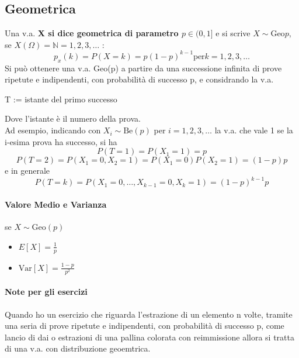 \documentclass[12pt, a4paper, openany]{book}
\begin{document}
\subsection*{Geometrica}
Una v.a. \textbf{X si dice geometrica di parametro $p \in (0,1]$} e si scrive 
\textbf{$X \sim \text{Geo}p$}, se \textbf{$X(\Omega)=\mathbb{N} = {1,2,3,\dots}$} :
\begin{equation*}
    p_x (k) = P(X = k) = p(1-p)^{k-1} \text{per} k=1,2,3,\dots
\end{equation*}
Si può ottenere una v.a. Geo(p) a partire da una successione infinita di prove ripetute
e indipendenti, con probabilità di successo p, e considrando la v.a.
\begin{center}
    T := istante del primo successo
\end{center}
Dove l'istante è il numero della prova.
\\ Ad esempio, indicando con $X_i \sim \text{Be}(p)$ per $i=1,2,3,\dots$ la v.a. che vale 1
se la i-esima prova ha successo, si ha
\begin{equation*}
    P(T=1) = P(X_1 = 1) = p
\end{equation*}
\begin{equation*}
    P(T=2) = P(X_1 = 0, X_2 = 1) = P(X_1 = 0)P(X_2 = 1) = (1-p)p
\end{equation*}
e in generale
\begin{equation*}
    P(T=k) = P(X_1=0, \dots, X_{k-1} = 0, X_k = 1) = (1-p)^{k-1}p
\end{equation*}
\paragraph*{Valore Medio e Varianza} se $X\sim \text{Geo}(p)$
\begin{itemize}
    \item $E[X] = \frac{1}{p}$
    \item $\text{Var}[X] = \frac{1-p}{p^2}$
\end{itemize}
\paragraph*{Note per gli esercizi}
Quando ho un esercizio che riguarda l'estrazione di un elemento n volte, tramite una seria
di prove ripetute e indipendenti, con probabilità di successo p, come lancio di dai o
estrazioni di una pallina colorata con reimmissione allora si tratta di una v.a. con
distribuzione geoemtrica.
\end{document}
